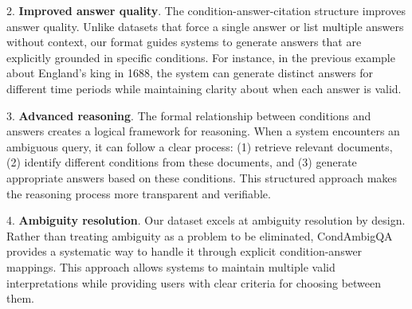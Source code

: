 2. \textbf{Improved answer quality}. The condition-answer-citation structure improves answer quality. Unlike datasets that force a single answer or list multiple answers without context, our format guides systems to generate answers that are explicitly grounded in specific conditions. For instance, in the previous example about England's king in 1688, the system can generate distinct answers for different time periods while maintaining clarity about when each answer is valid.

3. \textbf{Advanced reasoning}. The formal relationship between conditions and answers creates a logical framework for reasoning. When a system encounters an ambiguous query, it can follow a clear process: (1) retrieve relevant documents, (2) identify different conditions from these documents, and (3) generate appropriate answers based on these conditions. This structured approach makes the reasoning process more transparent and verifiable.

4. \textbf{Ambiguity resolution}. Our dataset excels at ambiguity resolution by design. Rather than treating ambiguity as a problem to be eliminated, CondAmbigQA provides a systematic way to handle it through explicit condition-answer mappings. This approach allows systems to maintain multiple valid interpretations while providing users with clear criteria for choosing between them.



